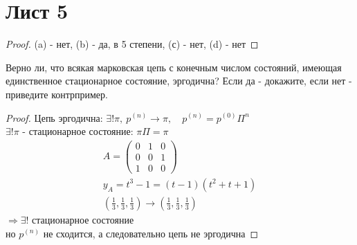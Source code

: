 \section{Лист 5}
    \begin{prob}
    \end{prob}
    \begin{proof}
    (a) - нет, (b) - да, в 5 степени, (с) - нет, (d) - нет
    \end{proof}
\vskip 0.6in


 
    \begin{prob}
        Верно ли, что всякая марковская цепь с конечным числом состояний, имеющая единственное стационарное состояние, эргодична? Если да - докажите, если нет - приведите контрпример.
    \end{prob}
    \begin{proof}
        Цепь эргодична: $\exists ! \pi,\ p^{(n)} \to \pi,\quad p^{(n)} = p^{(0)} \Pi^{n}$\\
        $\exists ! \pi$ - стационарное состояние: $\pi \Pi = \pi$
        \vskip 2in
        \begin{gather*}
            A = 
            \begin{pmatrix}
                0 & 1 & 0\\
                0 & 0 & 1\\
                1 & 0 & 0
            \end{pmatrix}\\
            y_{A} = t^3 - 1
            = (t-1)(t^2+t+1)\\
            \left(\frac{1}{3}, \frac{1}{3}, \frac{1}{3}\right)
            \to \left(\frac{1}{3}, \frac{1}{3}, \frac{1}{3}\right)
        \end{gather*}
        $\Rightarrow \exists !$ стационарное состояние\\
        но $p^{(n)}$ не сходится, а следовательно цепь не эргодична 
    \end{proof}
\vskip 0.6in


